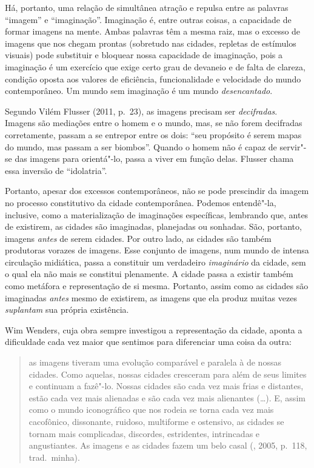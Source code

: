 Há, portanto, uma relação de simultânea atração e repulsa entre as
palavras ``imagem'' e ``imaginação''. Imaginação é, entre outras coisas,
a capacidade de formar imagens na mente. Ambas palavras têm a mesma
raiz, mas o excesso de imagens que nos chegam prontas (sobretudo nas
cidades, repletas de estímulos visuais) pode substituir e bloquear nossa
capacidade de imaginação, pois a imaginação é um exercício que exige
certo grau de devaneio e de falta de clareza, condição oposta aos valores de eficiência,
funcionalidade e velocidade do mundo contemporâneo. Um mundo sem imaginação é um mundo \emph{desencantado}.

Segundo Vilém Flusser (2011, p.~23), as imagens precisam ser
\emph{decifradas}. Imagens são mediações entre o homem e o mundo, mas, \label{decifradas}
se não forem decifradas corretamente, passam a se entrepor entre os
dois: ``seu propósito é serem mapas do mundo, mas passam a ser
biombos''. Quando o homem não é capaz de servir"-se das imagens para
orientá"-lo, passa a viver em função delas. Flusser chama essa inversão
de ``idolatria''.

Portanto, apesar dos excessos contemporâneos, não se pode prescindir da
imagem no processo constitutivo da cidade contemporânea. Podemos
entendê"-la, inclusive, como a materialização de imaginações específicas,
lembrando que, antes de existirem, as cidades são imaginadas, planejadas
ou sonhadas. São, portanto, imagens \emph{antes} de serem cidades. Por
outro lado, as cidades são também produtoras vorazes de imagens. Esse
conjunto de imagens, num mundo de intensa circulação midiática, passa a
constituir um verdadeiro \emph{imaginário} da cidade, sem o qual ela não
mais se constitui plenamente. A cidade passa a existir também como
metáfora e representação de si mesma. Portanto, assim como as cidades
são imaginadas \emph{antes} mesmo de existirem, as imagens que ela
produz muitas vezes \emph{suplantam} sua própria existência.

Wim Wenders, cuja obra sempre investigou a representação da cidade,
aponta a dificuldade cada vez maior que sentimos para diferenciar uma
coisa da outra:

\begin{quote}
as imagens tiveram uma evolução comparável e paralela à de nossas
cidades. Como aquelas, nossas cidades cresceram para além de seus
limites e continuam a fazê"-lo. Nossas cidades são cada vez mais frias e
distantes, estão cada vez mais alienadas e são cada vez mais alienantes
(\ldots{}). E, assim como o mundo iconográfico que nos rodeia se torna cada
vez mais cacofônico, dissonante, ruidoso, multiforme e ostensivo, as
cidades se tornam mais complicadas, discordes, estridentes, intrincadas
e angustiantes. As imagens e as cidades fazem um belo casal (,
2005, p.~118, trad.~minha).
\end{quote}

